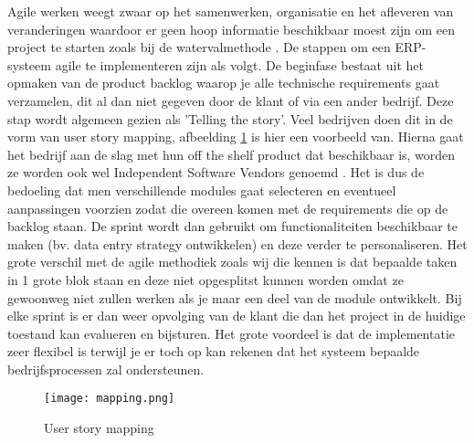 Agile werken weegt zwaar op het samenwerken, organisatie en het afleveren van veranderingen waardoor er geen hoop informatie beschikbaar moest zijn om een project te starten zoals bij de watervalmethode \autocite{Mrpeasy2018}. De stappen om een ERP-systeem agile te implementeren zijn als volgt. De beginfase bestaat uit het opmaken van de product backlog waarop je alle technische requirements gaat verzamelen, dit al dan niet gegeven door de klant of via een ander bedrijf. Deze stap wordt algemeen gezien als 'Telling the story'. Veel bedrijven doen dit in de vorm van user story mapping, afbeelding \ref{fig:mapping} is hier een voorbeeld van. Hierna gaat het bedrijf aan de slag met hun off the shelf product dat beschikbaar is, worden ze worden ook wel Independent Software Vendors genoemd \autocite{Mrpeasy2018} . Het is dus de bedoeling dat men verschillende modules gaat selecteren en eventueel aanpassingen voorzien zodat die overeen komen met de requirements die op de backlog staan. De sprint wordt dan gebruikt om functionaliteiten beschikbaar te maken (bv. data entry strategy ontwikkelen) en deze verder te personaliseren. Het grote verschil met de agile methodiek zoals wij die kennen is dat bepaalde taken in 1 grote blok staan en deze niet opgesplitst kunnen worden omdat ze gewoonweg niet zullen werken als je maar een deel van de module ontwikkelt. Bij elke sprint is er dan weer opvolging van de klant die dan het project in de huidige toestand kan evalueren en bijsturen. Het grote voordeel is dat de implementatie zeer flexibel is terwijl je er toch op kan rekenen dat het systeem bepaalde bedrijfsprocessen zal ondersteunen.

\begin{figure}[b!]
    \texttt{[image: mapping.png]}
    \caption{User story mapping}
    \label{fig:mapping}
\end{figure}